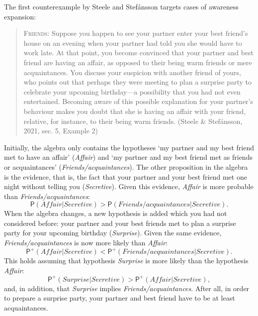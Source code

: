 \documentclass[
  11pt,
  dvipsnames,enabledeprecatedfontcommands]{scrartcl}
\newcommand{\pr}[1]{\ensuremath{\mathsf{P}(#1)}}
\newcommand{\ppr}[2]{\ensuremath{\mathsf{P}^{#1}(#2)}}
\begin{document}
The first counterexample by Steele and Stefánsson targets cases of
awareness expansion:

\begin{quote}
\textsc{Friends}: Suppose you happen to see your partner enter your best
friend's house on an evening when your partner had told you she would
have to work late. At that point, you become convinced that your partner
and best friend are having an affair, as opposed to their being warm
friends or mere acquaintances. You discuss your suspicion with another
friend of yours, who points out that perhaps they were meeting to plan a
surprise party to celebrate your upcoming birthday---a possibility that
you had not even entertained. Becoming aware of this possible
explanation for your partner's behaviour makes you doubt that she is
having an affair with your friend, relative, for instance, to their
being warm friends. (Steele \& Stefánsson, 2021, sec. 5, Example 2)
\end{quote}

\doublespace

\noindent Initially, the algebra only contains the hypotheses `my
partner and my best friend met to have an affair' (\textit{Affair}) and
`my partner and my best friend met as friends or acquaintances'
(\textit{Friends/acquaintances}). The other proposition in the algebra
is the evidence, that is, the fact that your partner and your best
friend met one night without telling you (\textit{Secretive}). Given
this evidence, \textit{Affair} is more probable than
\textit{Friends/acquaintances}:
\[\pr{\textit{Affair} \vert  \textit{Secretive} }> \pr{\textit{Friends/acquaintances} \vert \textit{Secretive}} \tag{>}.\]
When the algebra changes, a new hypothesis is added which you had not
considered before: your partner and your best friends met to plan a
surprise party for your upcoming birthday (\textit{Surprise}). Given the
same evidence, \textit{Friends/acquaintances} is now more likely than
\textit{Affair}:
\[\ppr{+}{\textit{Affair} \vert  \textit{Secretive} } < \ppr{+}{\textit{Friends/acquaintances} \vert \textit{Secretive}}. \tag{<}\]
This holds assuming that hypothesis \textit{Surprise} is more likely
than the hypothesis \textit{Affair}:
\[\ppr{+}{ \textit{Surprise} \vert \textit{Secretive}}> \ppr{+}{ \textit{Affair} \vert \textit{Secretive}},\]
and, in addition, that \textit{Surprise} implies
\textit{Friends/acquaintances}. After all, in order to prepare a
surprise party, your partner and best friend have to be at least
acquaintances.
\end{document}
